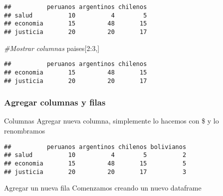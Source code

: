 \documentclass[
]{article}
\newenvironment{Shaded}{\begin{snugshade}}{\end{snugshade}}
\newcommand{\CommentTok}[1]{\textcolor[rgb]{0.56,0.35,0.01}{\textit{#1}}}
\newcommand{\DecValTok}[1]{\textcolor[rgb]{0.00,0.00,0.81}{#1}}
\newcommand{\FunctionTok}[1]{\textcolor[rgb]{0.00,0.00,0.00}{#1}}
\newcommand{\NormalTok}[1]{#1}
\newcommand{\OtherTok}[1]{\textcolor[rgb]{0.56,0.35,0.01}{#1}}
\newcommand{\SpecialCharTok}[1]{\textcolor[rgb]{0.00,0.00,0.00}{#1}}
\newcommand{\StringTok}[1]{\textcolor[rgb]{0.31,0.60,0.02}{#1}}
\begin{document}
\begin{verbatim}
##          peruanos argentinos chilenos
## salud          10          4        5
## economia       15         48       15
## justicia       20         20       17
\end{verbatim}

\begin{Shaded}
\begin{Highlighting}[]
\CommentTok{\#Mostrar columnas}
\NormalTok{paises[}\DecValTok{2}\SpecialCharTok{:}\DecValTok{3}\NormalTok{,]}
\end{Highlighting}
\end{Shaded}

\begin{verbatim}
##          peruanos argentinos chilenos
## economia       15         48       15
## justicia       20         20       17
\end{verbatim}

\hypertarget{agregar-columnas-y-filas}{%
\subsubsection{Agregar columnas y
filas}\label{agregar-columnas-y-filas}}

Columnas Agregar nueva columna, simplemente lo hacemos con \$ y lo
renombramos

\begin{Shaded}
\end{Shaded}

\begin{verbatim}
##          peruanos argentinos chilenos bolivianos
## salud          10          4        5          2
## economia       15         48       15          5
## justicia       20         20       17          3
\end{verbatim}

Agregar un nueva fila Comenzamos creando un nuevo dataframe
\end{document}
